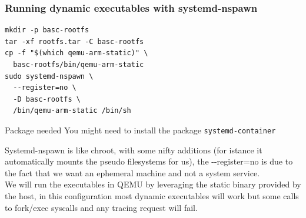 \begin{frame}[fragile]
  \frametitle{Running dynamic executables with systemd-nspawn}
  \begin{verbatim}
mkdir -p basc-rootfs
tar -xf rootfs.tar -C basc-rootfs
cp -f "$(which qemu-arm-static)" \
  basc-rootfs/bin/qemu-arm-static
sudo systemd-nspawn \
  --register=no \
  -D basc-rootfs \
  /bin/qemu-arm-static /bin/sh
  \end{verbatim}
  \begin{alertblock}{Package needed}
  You might need to install the package \texttt{systemd-container}
  \end{alertblock}
\end{frame}
\only<handout> {
  Systemd-nspawn is like chroot, with some nifty additions (for istance it automatically mounts the pseudo filesystems for us),
   the -{}-register=no is due to the fact that we want an ephemeral machine and not a system service. \\
  We will run the executables in QEMU by leveraging the static binary provided by the host, in this configuration
  most dynamic executables will work but some calls to fork/exec syscalls and any tracing request will fail.
}

